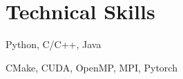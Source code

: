 \section{Technical Skills}
\resumeSubHeadingListStart

{Python, C/C++, Java }%

{CMake, CUDA, OpenMP, MPI, Pytorch} %


\resumeSubHeadingListEnd
